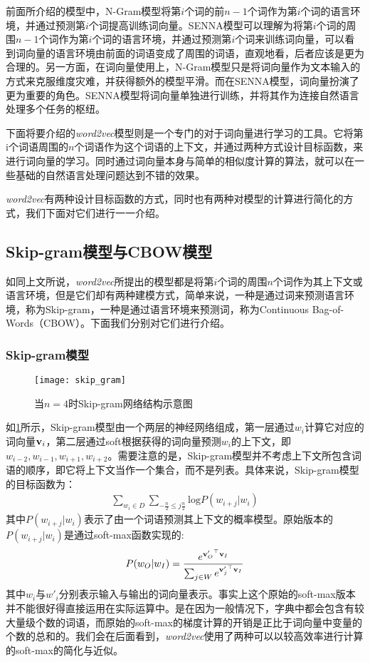 前面所介绍的模型中，N-Gram模型将第$i$个词的前$n-1$个词作为第$i$个词的语言环境，并通过预测第$i$个词提高训练词向量。SENNA模型可以理解为将第$i$个词的周围$n-1$个词作为第$i$个词的语言环境，并通过预测第$i$个词来训练词向量，可以看到词向量的语言环境由前面的词语变成了周围的词语，直观地看，后者应该是更为合理的。另一方面，在词向量使用上，N-Gram模型只是将词向量作为文本输入的方式来克服维度灾难，并获得额外的模型平滑。而在SENNA模型，词向量扮演了更为重要的角色。SENNA模型将词向量单独进行训练，并将其作为连接自然语言处理多个任务的枢纽。

下面将要介绍的\emph{word2vec}模型则是一个专门的对于词向量进行学习的工具。它将第i个词语周围的$n$个词语作为这个词语的上下文，并通过两种方式设计目标函数，来进行词向量的学习。同时通过词向量本身与简单的相似度计算的算法，就可以在一些基础的自然语言处理问题达到不错的效果。

\emph{word2vec}有两种设计目标函数的方式，同时也有两种对模型的计算进行简化的方式，我们下面对它们进行一一介绍。

\subsection{Skip-gram模型与CBOW模型}

如同上文所说，\emph{word2vec}所提出的模型都是将第$i$个词的周围$n$个词作为其上下文或语言环境，但是它们却有两种建模方式，简单来说，一种是通过词来预测语言环境，称为Skip-gram，一种是通过语言环境来预测词，称为Continuous Bag-of-Words（CBOW）。下面我们分别对它们进行介绍。

\subsubsection{Skip-gram模型}

\begin{figure}
\centering
\texttt{[image: skip\_gram]}
\caption{当$n=4$时Skip-gram网络结构示意图}
\label{fig:skip_gram}
\end{figure}

如\ref{fig:skip_gram}所示，Skip-gram模型由一个两层的神经网络组成，第一层通过$w_i$计算它对应的词向量${{\mathbf v}}_i$，第二层通过soft根据获得的词向量预测$w_i$的上下文，即$w_{i-2}, w_{i-1}, w_{i+1}, w_{i+2}$。需要注意的是，Skip-gram模型并不考虑上下文所包含词语的顺序，即它将上下文当作一个集合，而不是列表。具体来说，Skip-gram模型的目标函数为：
\begin{eqnarray*}
\sum_{w_i \in D} \sum_{-\frac{n}{2}\leq j \frac{n}{2}} \mathrm{log}P(w_{i+j} | w_i)
\end{eqnarray*}
其中$P(w_{i+j} | w_i)$表示了由一个词语预测其上下文的概率模型。原始版本的$P(w_{i+j} | w_i)$是通过soft-max函数实现的: 
\begin{equation}
\label{eq:soft_max}
P(w_O | w_I) = \frac{e^{{{{\mathbf v}}'_O}^\top {{\mathbf v}}_I}}{\sum_{j \in W} e^{{{{\mathbf v}}'_j}^\top {{\mathbf v}}_I}}
\end{equation}
其中$w_i$与$w'_i$分别表示输入与输出的词向量表示。事实上这个原始的soft-max版本并不能很好得直接运用在实际运算中。是在因为一般情况下，字典中都会包含有较大量级个数的词语，而原始的soft-max的梯度计算的开销是正比于词向量中变量的个数的总和的。我们会在后面看到，\emph{word2vec}使用了两种可以以较高效率进行计算的soft-max的简化与近似。

